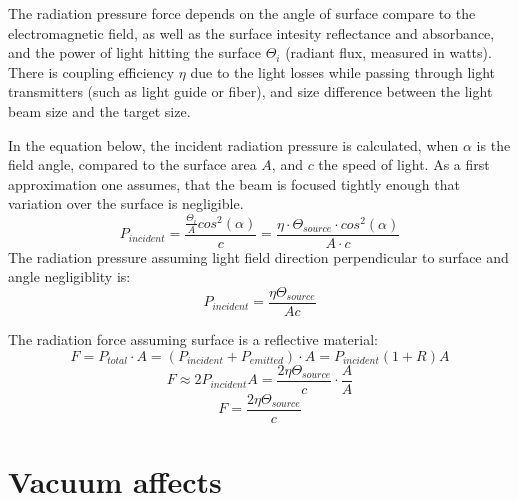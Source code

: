 \documentclass[\main/master.tex]{subfiles}
\begin{document}
\par\noindent
The radiation pressure force depends on the angle of surface compare to the electromagnetic field, as well as the surface intesity reflectance and absorbance, and the power of light hitting the surface $\Theta_i$ (radiant flux, measured in watts). There is coupling efficiency $\eta$ due to the light losses while passing through light transmitters (such as light guide or fiber), and size difference between the light beam size and the target size. 
\par\noindent
In the equation below, the incident radiation pressure is calculated, when $\alpha$ is the field angle, compared to the surface area $A$, and $c$ the speed of light. As a first approximation one assumes, that the beam is focused tightly enough that variation over the surface is negligible. 
\begin{equation}
P_{incident} = \frac{\frac{\Theta_i}{A}cos^2(\alpha)}{c} = \frac{\eta\cdot \Theta_{source}\cdot cos^2(\alpha)}{{A\cdot c}} \label{eqn:radiation_pressure}
\end{equation}
The radiation pressure assuming light field direction perpendicular to surface and angle negligiblity is: 
\begin{equation}
P_{incident} = \frac{\eta\Theta_{source}}{{Ac}} \label{eqn:radiation_pressure_perpendicular}
\end{equation}
\par\noindent
The radiation force assuming surface is a reflective material:
\begin{equation}
F = P_{total}\cdot A = (P_{incident}+P_{emitted})\cdot A = P_{incident}(1+R)A \label{eqn:radiation_force}
\end{equation}
\begin{equation}
F \approx 2P_{incident}A = \frac{2\eta\Theta_{source}}{{c}}\cdot \frac{A}{A} \label{eqn:radiation_force_reflective}
\end{equation}
\begin{equation}
F = \frac{2\eta\Theta_{source}}{{c}} \label{eqn:radiation_force_power}
\end{equation}

\section{Vacuum affects}
\end{document}
